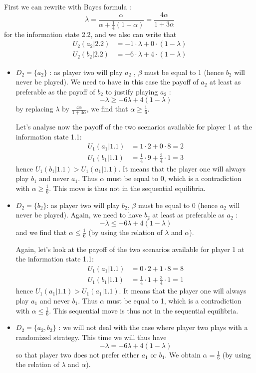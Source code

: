 First we can rewrite with Bayes formula : $$\lambda = \frac{\alpha}{\alpha + \frac{1}{4} (1-\alpha)} =\frac{4\alpha}{1+3\alpha}$$ for the information state 2.2, and we also can write that 
\begin{align*}
    U_2(a_2|2.2) &= -1 \cdot \lambda + 0 \cdot (1-\lambda)\\
    U_2(b_2|2.2) &= -6\cdot \lambda + 4 \cdot (1-\lambda) 
\end{align*} 
\begin{itemize}
    \item $D_2=\{a_2\}$ : as player two will play $a_2$ , $\beta$ must be equal to 1 (hence $b_2$ will never be played). We need to have in this case the payoff of $a_2$ at least as preferable as the payoff of  $b_2$ to justify playing $a_2$ : $$-\lambda \geq -6\lambda + 4 (1-\lambda)$$ by replacing $\lambda$ by $\frac{4\alpha}{1+3\alpha}$, we find that $\alpha \geq \frac{1}{6}$. 
    
    Let's analyse now the payoff of the two scenarios available for player 1 at the information state 1.1: 
    \begin{align*}
        U_1(a_1|1.1) &= 1 \cdot 2 + 0 \cdot 8 = 2\\
        U_1(b_1|1.1)& = \frac{1}{4} \cdot 9 + \frac{3}{4} \cdot 1 = 3
    \end{align*}
    hence $U_1(b_1|1.1)>U_1(a_1|1.1) $. It means that the player one will always play $b_1$  and never $a_1$. Thus $\alpha $ must be equal to 0, which is a contradiction with $\alpha \geq \frac{1}{6}$. This move is thus not in the sequential equilibria.
    \item $D_2=\{b_2\}$: as player two will play $b_2$, $\beta$ must be equal to 0 (hence $a_2$ will never be played). Again, we need to have $b_2$ at least as preferable as $a_2$ : $$-\lambda \leq -6\lambda + 4 (1-\lambda)$$
    and we find that $\alpha \leq \frac{1}{6}$ (by using the relation of $\lambda$ and $\alpha$). 
    
   Again, let's look at the payoff of the two scenarios available for player 1 at the information state 1.1: 
   \begin{align*}
       U_1(a_1|1.1) &= 0 \cdot 2 + 1 \cdot 8 = 8\\
       U_1(b_1|1.1) &= \frac{1}{4} \cdot 1 + \frac{3}{4} \cdot 1 = 1
   \end{align*} hence $U_1(a_1|1.1)>U_1(a_1|1.1) $. It means that the player one will always play $a_1$ and never $b_1$. Thus $\alpha$ must be equal to 1, which is a contradiction with $\alpha \leq \frac{1}{6}$. This sequential move is thus not in the sequential equilibria.
    \item $D_2=\{a_2,b_2\}$ : we will not deal with the case where player two plays with a randomized strategy. This time we will thus have 
    $$-\lambda = -6\lambda + 4 (1-\lambda)$$ so that player two does not prefer either $a_1$ or $b_1$. We obtain $\alpha = \frac{1}{6}$ (by using the relation of $\lambda$ and $\alpha$). 
    

\end{itemize}
